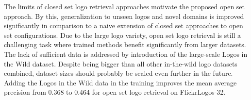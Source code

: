 \documentclass[a4paper,twoside]{article}
\begin{document}
%
\noindent The limits of closed set logo retrieval approaches motivate the proposed open set approach. By this, generalization to unseen logos and novel domains is improved significantly in comparison to a naive extension of closed set approaches to open set configurations. 
Due to the large logo variety, open set logo retrieval is still a challenging task where trained methods benefit significantly from larger datasets. The lack of sufficient data is addressed by introduction of the large-scale Logos in the Wild dataset. Despite being bigger than all other in-the-wild logo datasets combined, dataset sizes should probably be scaled even further in the future. Adding the Logos in the Wild data in the training improves the mean average precision from 0.368 to 0.464 for open set logo retrieval on FlickrLogos-32.



\vfill

{\small
}

\vfill
\end{document}
